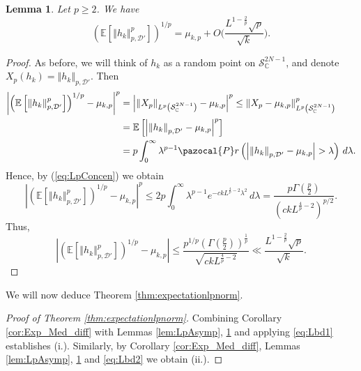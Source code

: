 \documentclass[12pt, a4paper]{amsart}
\newtheorem{lemma}[theorem]{Lemma}
\theoremstyle{definition}
\newcommand {\1} {\mathbf{1}}
\newcommand{\prob}{\pazocal{P}r}
\newcommand {\Dc} {\mathcal{D}}
\newcommand{\Scc}{{\mathcal{S}}}
\numberwithin{equation}{section}
\begin{document}
\begin{lemma}
\label{lem:Distance} Let $p \ge 2$. We have
\[
\left(\mathbb{E}\left[\left\Vert h_{k}\right\Vert _{p,\Dc'}^{p}\right]\right)^{1/p}=\mu_{k,p}+O\bigg( \frac{L^{1-\frac{2}{p}}\sqrt{p}}{\sqrt{k}}\bigg).
\]
\end{lemma}

\begin{proof}
As before, we will think of $h_{k}$ as a random point on $\Scc_{\mathbb{C}}^{2N-1}$,
and denote $X_{p}\left(h_{k}\right)=\left\Vert h_{k}\right\Vert _{p,\Dc'}$.
Then
\begin{align*}
\left|\left(\mathbb{E}\left[\left\Vert h_{k}\right\Vert _{p,\Dc'}^{p}\right]\right)^{1/p}-\mu_{k,p}\right|^{p} & =\left|\left\Vert X_{p}\right\Vert _{L^{p}\left(\Scc_{\mathbb{C}}^{2N-1}\right)}-\mu_{k,p}\right|^{p}\le\left\Vert X_{p}-\mu_{k,p}\right\Vert _{L^{p}\left(\Scc_{\mathbb{C}}^{2N-1}\right)}^{p}\\
 & =\mathbb{E}\left[\left|\left\Vert h_{k}\right\Vert _{p,\Dc'}-\mu_{k,p}\right|^{p}\right]\\
 & =p\int_{0}^{\infty}\lambda^{p-1}\prob\left(\left|\left\Vert h_{k}\right\Vert _{p,\Dc'}-\mu_{k,p}\right|>\lambda\right)\,d\lambda.
\end{align*}
Hence, by (\ref{eq:LpConcen}) we obtain
\[
\left|\left(\mathbb{E}\left[\left\Vert h_{k}\right\Vert _{p,\Dc'}^{p}\right]\right)^{1/p}-\mu_{k,p}\right|^{p}\le2p\int_{0}^{\infty}\lambda^{p-1} e^{-c k L^{\frac{4}{p}-2} \lambda^2}\,d\lambda=\frac{p\Gamma\left(\frac{p}{2}\right)}{(ck L^{\frac4p-2})^{p/2}}.
\]
Thus,
\[
\left|\left(\mathbb{E}\left[\left\Vert h_{k}\right\Vert _{p,\Dc'}^{p}\right]\right)^{1/p}-\mu_{k,p}\right|\le\frac{p^{1/p}\left(\Gamma\left(\frac{p}{2}\right)\right)^{\frac{1}{p}}}{\sqrt{ck L^{\frac4p-2}}}\ll \frac{L^{1-\frac{2}{p}}\sqrt{p}}{\sqrt{k}}.
\]
\end{proof}


We will now deduce Theorem \ref{thm:expectationlpnorm}.

\begin{proof}[Proof of Theorem \ref{thm:expectationlpnorm}]
Combining Corollary \ref{cor:Exp_Med_diff} with Lemmas \ref{lem:LpAsymp}, \ref{lem:Distance} and applying \eqref{eq:Lbd1} establishes (i.). Similarly, by Corollary \ref{cor:Exp_Med_diff}, Lemmas \ref{lem:LpAsymp}, \ref{lem:Distance} and \eqref{eq:Lbd2} we obtain (ii.).
\end{proof}
\end{document}

